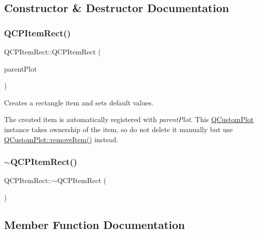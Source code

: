 \subsection{Constructor \& Destructor Documentation}
\mbox{\label{class_q_c_p_item_rect_a412ad1579f7a1fba453d0fa28c496cbc}} 
\subsubsection{\texorpdfstring{Q\+C\+P\+Item\+Rect()}{QCPItemRect()}}
{\footnotesize\ttfamily Q\+C\+P\+Item\+Rect\+::\+Q\+C\+P\+Item\+Rect (\begin{DoxyParamCaption}\item[{\hyperlink{class_q_custom_plot}{Q\+Custom\+Plot} $\ast$}]{parent\+Plot }\end{DoxyParamCaption})\hspace{0.3cm}{\ttfamily [explicit]}}

Creates a rectangle item and sets default values.

The created item is automatically registered with {\itshape parent\+Plot}. This \hyperlink{class_q_custom_plot}{Q\+Custom\+Plot} instance takes ownership of the item, so do not delete it manually but use \hyperlink{class_q_custom_plot_ae04446557292551e8fb6e2c106e1848d}{Q\+Custom\+Plot\+::remove\+Item()} instead. \mbox{\label{class_q_c_p_item_rect_af9e89f80457afc2d0fd2c6527b40a5f2}} 
\subsubsection{\texorpdfstring{$\sim$\+Q\+C\+P\+Item\+Rect()}{~QCPItemRect()}}
{\footnotesize\ttfamily Q\+C\+P\+Item\+Rect\+::$\sim$\+Q\+C\+P\+Item\+Rect (\begin{DoxyParamCaption}{ }\end{DoxyParamCaption})\hspace{0.3cm}{\ttfamily [virtual]}}



\subsection{Member Function Documentation}
\mbox{\label{class_q_c_p_item_rect_a844027325b33a3b7eef424128ee5109c}} 
